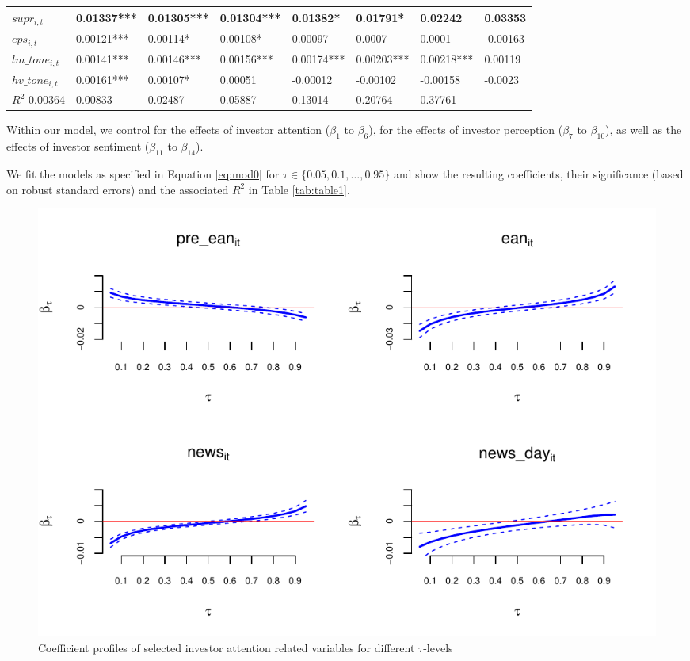\documentclass[]{article}
\begin{document}
\begin{small}
\begin{table}
\begin{tabular}[t]{l|l|l|l|l|l|l|l}
\hline
$supr_{i,t}$ & 0.01337*** & 0.01305*** & 0.01304*** & 0.01382* & 0.01791* & 0.02242 & 0.03353\\
\hline
$eps_{i,t}$ & 0.00121*** & 0.00114* & 0.00108* & 0.00097 & 0.0007 & 0.0001 & -0.00163\\
\hline
$lm\_tone_{i,t}$ & 0.00141*** & 0.00146*** & 0.00156*** & 0.00174*** & 0.00203*** & 0.00218*** & 0.00119\\
\hline
$hv\_tone_{i,t}$ & 0.00161*** & 0.00107* & 0.00051 & -0.00012 & -0.00102 & -0.00158 & -0.0023\\
\hline
$R^2$  0.00364 & 0.00833 & 0.02487 & 0.05887 & 0.13014 & 0.20764 & 0.37761\\
\hline
\end{tabular}
\end{table}
\end{small}

Within our model, we control for the effects of investor attention (\(\beta_1\) to \(\beta_6\)), for the effects of investor perception (\(\beta_7\) to \(\beta_{10}\)), as well as the effects of investor sentiment (\(\beta_{11}\) to \(\beta_{14}\)).

We fit the models as specified in Equation \eqref{eq:mod0} for \(\tau\in\{0.05,0.1,\ldots,0.95\}\) and show the resulting coefficients, their significance (based on robust standard errors) and the associated \(R^2\) in Table \ref{tab:table1}.

\begin{figure}[h!]
\centering
\includegraphics{sentiment_analysis_files/figure-latex/figure1-1.pdf}
\caption{\label{fig:figure1}Coefficient profiles of selected investor attention related variables for different \(\tau\)-levels}
\end{figure}
\end{document}
